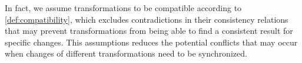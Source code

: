 In fact, we assume transformations to be compatible according to \autoref{def:compatibility}, which excludes contradictions in their consistency relations that may prevent transformations from being able to find a consistent result for specific changes.
This assumptions reduces the potential conflicts that may occur when changes of different transformations need to be synchronized.


